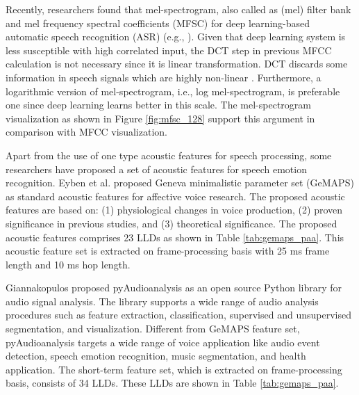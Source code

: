 Recently, researchers found that mel-spectrogram, also called as (mel) filter
bank and mel frequency spectral coefficients (MFSC) for deep learning-based
automatic speech recognition (ASR) (e.g., \cite{Mohamed2014}). Given that deep
learning system is less susceptible with high correlated input, the DCT step in
previous MFCC calculation is not necessary since it is linear transformation.
DCT discards some information in speech signals which are highly non-linear
\cite{fayek2016}. Furthermore, a logarithmic version of mel-spectrogram, i.e.,
log mel-spectrogram, is preferable one since deep learning learns better in
this scale. The mel-spectrogram visualization as shown in Figure
\ref{fig:mfsc_128} support this argument in comparison with MFCC visualization.

Apart from the use of one type acoustic features for speech processing, some
researchers have proposed a set of acoustic features for speech emotion
recognition. Eyben et al. \cite{Eyben} proposed Geneva minimalistic parameter
set (GeMAPS) as standard acoustic features for affective voice research. The
proposed acoustic features are based on: (1) physiological changes in voice
production, (2) proven significance in previous studies, and (3) theoretical
significance. The proposed acoustic features comprises 23 LLDs as shown in
Table \ref{tab:gemaps_paa}. This acoustic feature set is extracted on
frame-processing basis with 25 ms frame length and 10 ms hop length.

Giannakopulos \cite{Giannakopoulos2015} proposed pyAudioanalysis as an open
source Python library for audio signal analysis. The library supports a wide
range of audio analysis procedures such as feature extraction, classification,
supervised and unsupervised segmentation, and visualization. Different from
GeMAPS feature set, pyAudioanalysis targets a wide range of voice application
like audio event detection, speech emotion recognition, music segmentation, and
health application. The short-term feature set, which is extracted on
frame-processing basis, consists of 34 LLDs. These LLDs are shown in Table 
\ref{tab:gemaps_paa}.

